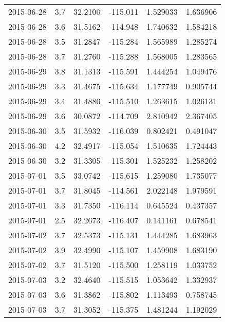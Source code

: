 \begin{tabular}{lrrrrr}
2015-06-28 &       3.7 &  32.2100 &  -115.011 &         1.529033 &         1.636906 \\
2015-06-28 &       3.6 &  31.5162 &  -114.948 &         1.740632 &         1.584218 \\
2015-06-28 &       3.5 &  31.2847 &  -115.284 &         1.565989 &         1.285274 \\
2015-06-28 &       3.7 &  31.2760 &  -115.288 &         1.568005 &         1.283565 \\
2015-06-29 &       3.8 &  31.1313 &  -115.591 &         1.444254 &         1.049476 \\
2015-06-29 &       3.3 &  31.4675 &  -115.634 &         1.177749 &         0.905744 \\
2015-06-29 &       3.4 &  31.4880 &  -115.510 &         1.263615 &         1.026131 \\
2015-06-29 &       3.6 &  30.0872 &  -114.709 &         2.810942 &         2.367405 \\
2015-06-30 &       3.5 &  31.5932 &  -116.039 &         0.802421 &         0.491047 \\
2015-06-30 &       4.2 &  32.4917 &  -115.054 &         1.510635 &         1.724443 \\
2015-06-30 &       3.2 &  31.3305 &  -115.301 &         1.525232 &         1.258202 \\
2015-07-01 &       3.5 &  33.0742 &  -115.615 &         1.259080 &         1.735077 \\
2015-07-01 &       3.7 &  31.8045 &  -114.561 &         2.022148 &         1.979591 \\
2015-07-01 &       3.3 &  31.7350 &  -116.114 &         0.645524 &         0.437357 \\
2015-07-01 &       2.5 &  32.2673 &  -116.407 &         0.141161 &         0.678541 \\
2015-07-02 &       3.7 &  32.5373 &  -115.131 &         1.444285 &         1.683963 \\
2015-07-02 &       3.9 &  32.4990 &  -115.107 &         1.459908 &         1.683190 \\
2015-07-02 &       3.7 &  31.5120 &  -115.500 &         1.258119 &         1.033752 \\
2015-07-03 &       3.2 &  32.4640 &  -115.515 &         1.053642 &         1.332937 \\
2015-07-03 &       3.6 &  31.3862 &  -115.802 &         1.113493 &         0.758745 \\
2015-07-03 &       3.7 &  31.3052 &  -115.375 &         1.481244 &         1.192029 \\

\end{tabular}
